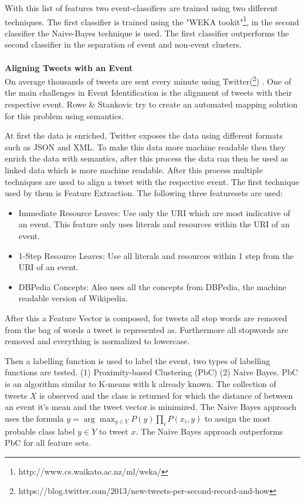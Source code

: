 \documentclass{article}
\begin{document}
With this list of features two event-classifiers are trained using two different techniques. The first classifier is trained using the "WEKA tookit"\footnote{http://www.cs.waikato.ac.nz/ml/weka/}, in the second classifier the  Naive-Bayes technique is used. The first classifier outperforms the second classifier in the separation of event and non-event clusters. \cite{eventident}
\\\\
\textbf{Aligning Tweets with an Event} \\
On average thousands of tweets are sent every minute using Twitter(\footnote{https://blog.twitter.com/2013/new-tweets-per-second-record-and-how}) . One of the main challenges in Event Identification is the alignment of tweets with their respective event. Rowe \& Stankovic try to create an automated mapping solution for this problem using semantics. \cite{eventalign}


At first the data is enriched, Twitter exposes the data using different formats such as JSON and XML. To make this data more machine readable then they enrich the data with semantics, after this process the data can then  be used as linked data which is more machine readable. After this process multiple techniques are used to align a tweet with the respective event. The first technique used by them is Feature Extraction. \cite{eventalign} The following three featuresets are used:
\begin{itemize}

  \item Immediate Resource Leaves: Use only the URI which are most indicative of an event. This feature only uses literals and resources within the URI of an event. 
  \item 1-Step Resource Leaves: Use all literals and resources within 1 step from the URI of an event. 
  \item DBPedia Concepts: Also uses all the concepts from DBPedia, the machine readable version of Wikipedia.
\end{itemize}
After this a Feature Vector is composed, for tweets all stop words are removed from the bag of words a tweet is represented as. Furthermore all stopwords are removed and everything is normalized to lowercase. \cite{eventalign} 

Then a labelling function is used to label the event, two types of labelling functions are tested. (1) Proximity-based Clustering (PbC) (2) Naive Bayes. PbC is an algorithm similar to K-means with k already known. The collection of tweets $X$ is observed and the class is returned for which the distance of between an event it's mean and the tweet vector is minimized. The Naive Bayes approach uses the formula $y = \arg\max_{y \in Y} P(y)\prod_i P(x_i, y)$ to assign the most probable class label $y \in Y$ to tweet $x$. The Naive Bayes approach outperforms PbC for all feature sets.  \cite{eventalign}
\end{document}
